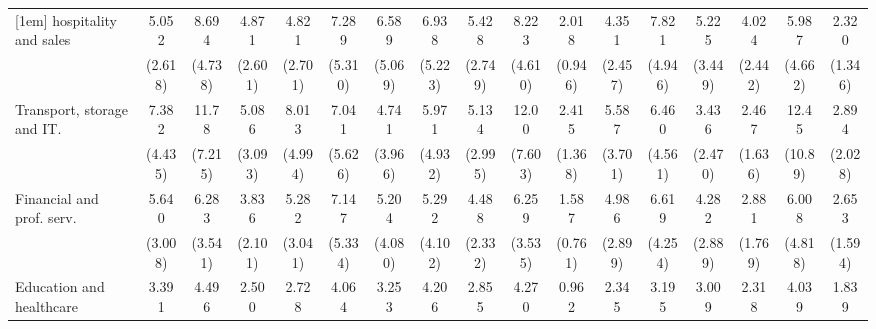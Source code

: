 {\begin{tabular}{l*{16}{c}}
[1em]
hospitality and sales&       5.052\sym{**} &       8.694\sym{***}&       4.871\sym{**} &       4.821\sym{**} &       7.289\sym{**} &       6.589\sym{*}  &       6.938\sym{*}  &       5.428\sym{***}&       8.223\sym{***}&       2.018         &       4.351\sym{**} &       7.821\sym{**} &       5.225\sym{*}  &       4.024\sym{*}  &       5.987\sym{*}  &       2.320         \\
                    &     (2.618)         &     (4.738)         &     (2.601)         &     (2.701)         &     (5.310)         &     (5.069)         &     (5.223)         &     (2.749)         &     (4.610)         &     (0.946)         &     (2.457)         &     (4.946)         &     (3.449)         &     (2.442)         &     (4.662)         &     (1.346)         \\
[1em]
Transport, storage and IT.&       7.382\sym{***}&       11.78\sym{***}&       5.086\sym{**} &       8.013\sym{***}&       7.041\sym{*}  &       4.741         &       5.971\sym{*}  &       5.134\sym{**} &       12.00\sym{***}&       2.415         &       5.587\sym{**} &       6.460\sym{**} &       3.436         &       2.467         &       12.45\sym{**} &       2.894         \\
                    &     (4.435)         &     (7.215)         &     (3.093)         &     (4.994)         &     (5.626)         &     (3.966)         &     (4.932)         &     (2.995)         &     (7.603)         &     (1.368)         &     (3.701)         &     (4.561)         &     (2.470)         &     (1.636)         &     (10.89)         &     (2.028)         \\
[1em]
Financial and prof. serv.&       5.640\sym{**} &       6.283\sym{**} &       3.836\sym{*}  &       5.282\sym{**} &       7.147\sym{**} &       5.204\sym{*}  &       5.292\sym{*}  &       4.488\sym{**} &       6.259\sym{**} &       1.587         &       4.986\sym{**} &       6.619\sym{**} &       4.282\sym{*}  &       2.881         &       6.008\sym{*}  &       2.653         \\
                    &     (3.008)         &     (3.541)         &     (2.101)         &     (3.041)         &     (5.334)         &     (4.080)         &     (4.102)         &     (2.332)         &     (3.535)         &     (0.761)         &     (2.899)         &     (4.254)         &     (2.889)         &     (1.769)         &     (4.818)         &     (1.594)         \\
[1em]
Education and healthcare&       3.391\sym{*}  &       4.496\sym{**} &       2.500         &       2.728         &       4.064         &       3.253         &       4.206         &       2.855\sym{*}  &       4.270\sym{*}  &       0.962         &       2.345         &       3.195         &       3.009         &       2.318         &       4.039         &       1.839         \\

\end{tabular}}

